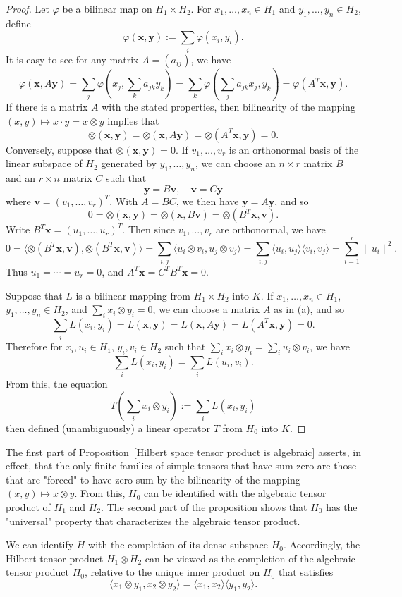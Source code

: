 \begin{proof}
Let $\varphi$ be a bilinear map on $H_1\times H_2$. For $x_1,\dots,x_n\in H_1$ and $y_1,\dots,y_n\in H_2$, define
\[\varphi(\bm{x},\bm{y}):=\sum_i\varphi(x_i,y_i).\]
It is easy to see for any matrix $A=(a_{ij})$, we have
\[\varphi(\bm{x},A\bm{y})=\sum_{j}\varphi(x_j,\sum_ka_{jk}y_k)=\sum_{k}\varphi(\sum_ja_{jk}x_j,y_k)=\varphi(A^T\bm{x},\bm{y}).\]
If there is a matrix $A$ with the stated properties, then bilinearity of the mapping $(x,y)\mapsto x\cdot y=x\otimes y$ implies that
\[\otimes(\bm{x},\bm{y})=\otimes(\bm{x},A\bm{y})=\otimes(A^T\bm{x},\bm{y})=0.\]
Conversely, suppose that $\otimes(\bm{x},\bm{y})=0$. If $v_1,\dots,v_r$ is an orthonormal basis of the linear subspace of $H_2$ generated by $y_1,\dots,y_n$, we can choose an $n\times r$ matrix $B$ and an $r\times n$ matrix $C$ such that
\[\bm{y}=B\bm{v},\quad \bm{v}=C\bm{y}\]
where $\bm{v}=(v_1,\dots,v_r)^T$. With $A=BC$, we then have $\bm{y}=A\bm{y}$, and so
\[0=\otimes(\bm{x},\bm{y})=\otimes(\bm{x},B\bm{v})=\otimes(B^T\bm{x},\bm{v}).\]
Write $B^T\bm{x}=(u_1,\dots,u_r)^T$. Then since $v_1,\dots,v_r$ are orthonormal, we have
\[0=\langle\otimes(B^T\bm{x},\bm{v}),\otimes(B^T\bm{x},\bm{v})\rangle=\sum_{i,j}\langle u_i\otimes v_i,u_j\otimes v_j\rangle=\sum_{i,j}\langle u_i,u_j\rangle\langle v_i,v_j\rangle=\sum_{i=1}^{r}\|u_i\|^2.\]
Thus $u_1=\cdots=u_r=0$, and $A^T\bm{x}=C^TB^T\bm{x}=0$.\par
Suppose that $L$ is a bilinear mapping from $H_1\times H_2$ into $K$. If $x_1,\dots,x_n\in H_1$, $y_1,\dots,y_n\in H_2$, and $\sum_ix_i\otimes y_i=0$, we can choose a matrix $A$ as in (a), and so
\[\sum_iL(x_i,y_i)=L(\bm{x},\bm{y})=L(\bm{x},A\bm{y})=L(A^T\bm{x},\bm{y})=0.\]
Therefore for $x_i,u_i\in H_1$, $y_i,v_i\in H_2$ such that $\sum_ix_i\otimes y_i=\sum_iu_i\otimes v_i$, we have
\[\sum_iL(x_i,y_i)=\sum_iL(u_i,v_i).\]
From this, the equation
\[T(\sum_ix_i\otimes y_i):=\sum_iL(x_i,y_i)\]
then defined (unambiguously) a linear operator $T$ from $H_0$ into $K$.
\end{proof}
\begin{remark}
The first part of Proposition~\ref{Hilbert space tensor product is algebraic} asserts, in effect, that the only finite families of simple tensors that have sum zero are those that are "forced" to have zero sum by the bilinearity of the mapping $(x,y)\mapsto x\otimes y$. From this, $H_0$ can be identified with the algebraic tensor product of $H_1$ and $H_2$. The second part of the proposition shows that $H_0$ has the "universal" property that characterizes the algebraic tensor product.\par
We can identify $H$ with the completion of its dense subspace $H_0$. Accordingly, the Hilbert tensor product $H_1\otimes H_2$ can be viewed as the completion of the algebraic tensor product $H_0$, relative to the unique inner product on $H_0$ that satisfies
\[\langle x_1\otimes y_1,x_2\otimes y_2\rangle=\langle x_1,x_2\rangle\langle y_1,y_2\rangle.\]
\end{remark}
